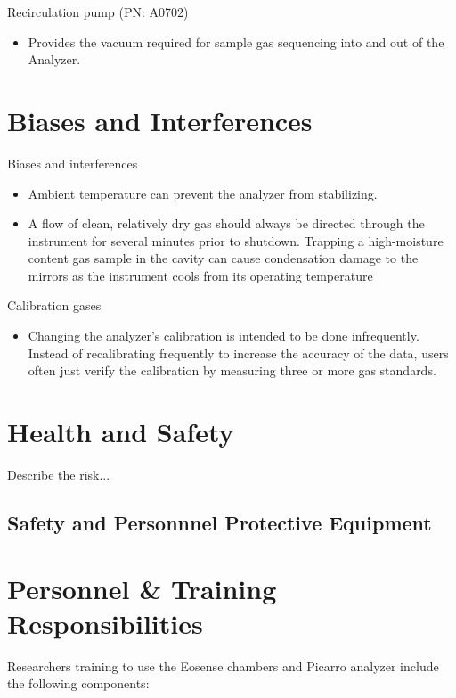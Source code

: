 \documentclass[12pt]{../SOP3}\usepackage[]{graphicx}\usepackage[]{color}
\begin{document}
\NP Recirculation pump (PN: A0702) 
  \begin{itemize}
  \item Provides the vacuum required for sample gas sequencing into and out of the Analyzer. 
  \end{itemize}
  
\section{Biases and Interferences}

\NP Biases and interferences
\begin{itemize}
  \item Ambient temperature can prevent the analyzer from stabilizing.
  \item A flow of clean, relatively dry gas should always be directed through the instrument for several minutes prior to shutdown. Trapping a high-moisture content gas sample in the cavity can cause condensation damage to the mirrors as the instrument cools from its operating temperature
\end{itemize}

\NP Calibration gases
\begin{itemize}
\item Changing the analyzer’s calibration is intended to be done infrequently. Instead of recalibrating frequently to increase the accuracy of the data, users often just verify the calibration by measuring three or more gas standards.
\end{itemize}

\section{Health and Safety}

\NP Describe the risk...


\subsection*{Safety and Personnnel Protective Equipment}


\section{Personnel \& Training Responsibilities}

Researchers training to use the Eosense chambers and Picarro analyzer include the following components: 
\end{document}
